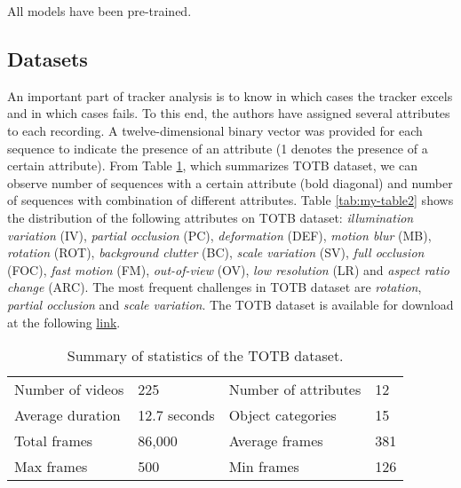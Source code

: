 All models have been pre-trained.
\subsection{Datasets}
An important part of tracker analysis is to know in which cases the tracker excels and in which cases fails. To this end, the authors have assigned several attributes to each recording. A twelve-dimensional binary vector was provided for each sequence to indicate the presence of an attribute (1 denotes the presence of a certain attribute). From Table \ref{tab:my-table1}, which summarizes TOTB dataset, we can observe number of sequences with a certain attribute (bold diagonal) and number of sequences with combination of different attributes. Table \ref{tab:my-table2} shows the distribution of the following attributes on TOTB dataset: \textit{illumination variation} (IV), \textit{partial occlusion} (PC), \textit{deformation} (DEF), \textit{motion blur} (MB), \textit{rotation} (ROT), \textit{background clutter} (BC), \textit{scale variation} (SV), \textit{full occlusion} (FOC), \textit{fast motion} (FM), \textit{out-of-view} (OV), \textit{low resolution} (LR) and \textit{aspect ratio change} (ARC). The most frequent challenges in TOTB dataset are \textit{rotation}, \textit{partial occlusion} and \textit{scale variation}.
The TOTB dataset is available for download at the following \href{https://drive.google.com/file/d/1eIbg5wpBoJbGHgv3g-ucW45g-wfQf_Y6/view}{link}.

\begin{table}[h]
\centering
\caption{Summary of statistics of the TOTB dataset.}
\label{tab:my-table1}
\begin{tabular}{@{}llll@{}}
\toprule
Number of videos     & 225      &Number of attributes& 12   \\
Average duration     & 12.7 seconds &Object categories  &15 \\
Total frames         & 86,000     &Average frames&  381 \\
Max frames           & 500         &Min frames   &126    \\ \bottomrule
\end{tabular}
\end{table}

